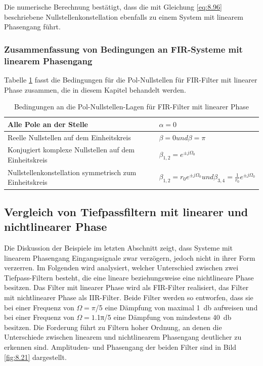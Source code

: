 Die numerische Berechnung bestätigt, dass die mit Gleichung \eqref{eq:8.96} beschriebene Nullstellenkonstellation ebenfalls zu einem System mit linearem Phasengang führt.

\subsubsection{\texorpdfstring{Zusammenfassung von Bedingungen an FIR-Systeme mit linearem Phasengang }{Zusammenfassung von Bedingungen an FIR-Systeme mit linearem Phasengang }}\label{zusammenfassung-von-bedingungen-an-fir-systeme-mit-linearem-phasengang}

Tabelle \ref{tab:8.1} fasst die Bedingungen für die Pol-Nullstellen für FIR-Filter mit linearer Phase zusammen, die in diesem Kapitel behandelt werden.

\begin{table}
  \centering
  \caption{Bedingungen an die Pol-Nullstellen-Lagen für FIR-Filter mit linearer Phase}
  \label{tab:8.1}
  \begin{tabular}{ll}
    \toprule
    Alle Pole an der Stelle & \(\alpha = 0\) \\
    \midrule
    Reelle Nullstellen auf dem Einheitskreis & \(\beta = 0und\beta = \pi\) \\
    Konjugiert komplexe Nullstellen 
auf dem Einheitskreis
 & \(\beta_{1,2} = e^{\pm j  \Omega_{0}}\) \\
    Nullstellenkonstellation 
symmetrisch zum Einheitskreis
 & \(\beta_{1,2} = r_{0}  e^{\pm j  \Omega_{0}}und\beta_{3,4} = \frac{1}{r_{0}}  e^{\pm j  \Omega_{0}}\) \\
    \bottomrule
  \end{tabular}
\end{table}

\subsection{Vergleich von Tiefpassfiltern mit linearer und nichtlinearer Phase}\label{sec:8.4.7}

Die Diskussion der Beispiele im letzten Abschnitt zeigt, dass Systeme mit linearem Phasengang Eingangssignale zwar verzögern, jedoch nicht in ihrer Form verzerren. Im Folgenden wird analysiert, welcher Unterschied zwischen zwei Tiefpass-Filtern besteht, die eine lineare beziehungsweise eine nichtlineare Phase besitzen. Das Filter mit linearer Phase wird als FIR-Filter realisiert, das Filter mit nichtlinearer Phase als IIR-Filter. Beide Filter werden so entworfen, dass sie bei einer Frequenz von \(Ω = π\)/5 eine Dämpfung von maximal \qty{1}{\decibel} aufweisen und bei einer Frequenz von \(Ω = 1\).1π/5 eine Dämpfung von mindestens \qty{40}{\decibel} besitzen. Die Forderung führt zu Filtern hoher Ordnung, an denen die Unterschiede zwischen linearem und nichtlinearem Phasengang deutlicher zu erkennen sind. Amplituden- und Phasengang der beiden Filter sind in Bild \ref{fig:8.21} dargestellt.

